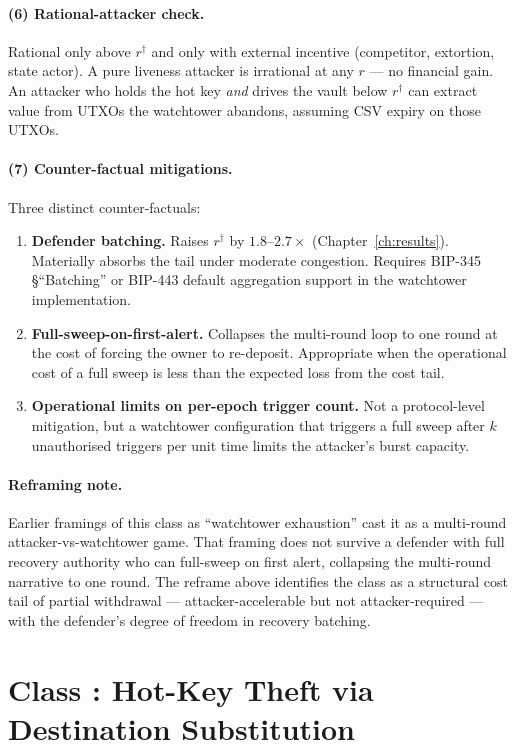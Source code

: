 \paragraph{(6) Rational-attacker check.}
Rational only above $r^\dagger$ and only with external incentive
(competitor, extortion, state actor). A pure liveness attacker is
irrational at any $r$ --- no financial gain. An attacker who holds
the hot key \emph{and} drives the vault below $r^\dagger$ can extract
value from UTXOs the watchtower abandons, assuming CSV expiry on
those UTXOs.

\paragraph{(7) Counter-factual mitigations.}
Three distinct counter-factuals:
\begin{enumerate}
\item \textbf{Defender batching.} Raises $r^\dagger$ by
  $1.8$--$2.7\times$ (Chapter~\ref{ch:results}). Materially absorbs
  the tail under moderate congestion. Requires BIP-345
  §``Batching'' or BIP-443 default aggregation support in the
  watchtower implementation.
\item \textbf{Full-sweep-on-first-alert.} Collapses the multi-round
  loop to one round at the cost of forcing the owner to re-deposit.
  Appropriate when the operational cost of a full sweep is less than
  the expected loss from the cost tail.
\item \textbf{Operational limits on per-epoch trigger count.} Not a
  protocol-level mitigation, but a watchtower configuration that
  triggers a full sweep after $k$ unauthorised triggers per unit
  time limits the attacker's burst capacity.
\end{enumerate}

\paragraph{Reframing note.}
Earlier framings of this class as ``watchtower exhaustion'' cast it
as a multi-round attacker-vs-watchtower game. That framing does not
survive a defender with full recovery authority who can full-sweep
on first alert, collapsing the multi-round narrative to one round.
The reframe above identifies the class as a structural cost tail of
partial withdrawal --- attacker-accelerable but not
attacker-required --- with the defender's degree of freedom in
recovery batching.

\section{Class \classhot{}: Hot-Key Theft via Destination Substitution}
\label{app:rat:classhot}

